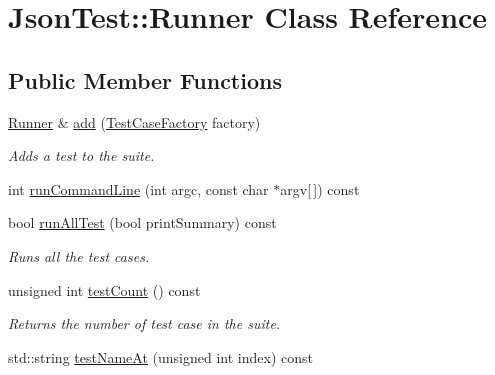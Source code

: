 \hypertarget{class_json_test_1_1_runner}{\section{Json\+Test\+:\+:Runner Class Reference}
\label{class_json_test_1_1_runner}
}
\subsection*{Public Member Functions}
\begin{DoxyCompactItemize}
\item 
\hypertarget{class_json_test_1_1_runner_a48ad0b4b724b2076ecdd752318beec8c}{\hyperlink{class_json_test_1_1_runner}{Runner} \& \hyperlink{class_json_test_1_1_runner_a48ad0b4b724b2076ecdd752318beec8c}{add} (\hyperlink{namespace_json_test_a7ed671d588f9809e32a8fffb031853c5}{Test\+Case\+Factory} factory)}\label{class_json_test_1_1_runner_a48ad0b4b724b2076ecdd752318beec8c}

\begin{DoxyCompactList}\small\item\em Adds a test to the suite. \end{DoxyCompactList}\item 
int \hyperlink{class_json_test_1_1_runner_a34725df8c1abcba246439d7f7fc3d1e6}{run\+Command\+Line} (int argc, const char $\ast$argv\mbox{[}$\,$\mbox{]}) const 
\item 
\hypertarget{class_json_test_1_1_runner_a907cd950b1f6dfd0cdd2aaca2065f3a7}{bool \hyperlink{class_json_test_1_1_runner_a907cd950b1f6dfd0cdd2aaca2065f3a7}{run\+All\+Test} (bool print\+Summary) const }\label{class_json_test_1_1_runner_a907cd950b1f6dfd0cdd2aaca2065f3a7}

\begin{DoxyCompactList}\small\item\em Runs all the test cases. \end{DoxyCompactList}\item 
\hypertarget{class_json_test_1_1_runner_af607a6ddb0759b925c0aded92b0c5cbd}{unsigned int \hyperlink{class_json_test_1_1_runner_af607a6ddb0759b925c0aded92b0c5cbd}{test\+Count} () const }\label{class_json_test_1_1_runner_af607a6ddb0759b925c0aded92b0c5cbd}

\begin{DoxyCompactList}\small\item\em Returns the number of test case in the suite. \end{DoxyCompactList}\item 
\hypertarget{class_json_test_1_1_runner_adfdfafaf566c78564073d480fb8e6b43}{std\+::string \hyperlink{class_json_test_1_1_runner_adfdfafaf566c78564073d480fb8e6b43}{test\+Name\+At} (unsigned int index) const }\label{class_json_test_1_1_runner_adfdfafaf566c78564073d480fb8e6b43}


\end{DoxyCompactItemize}
